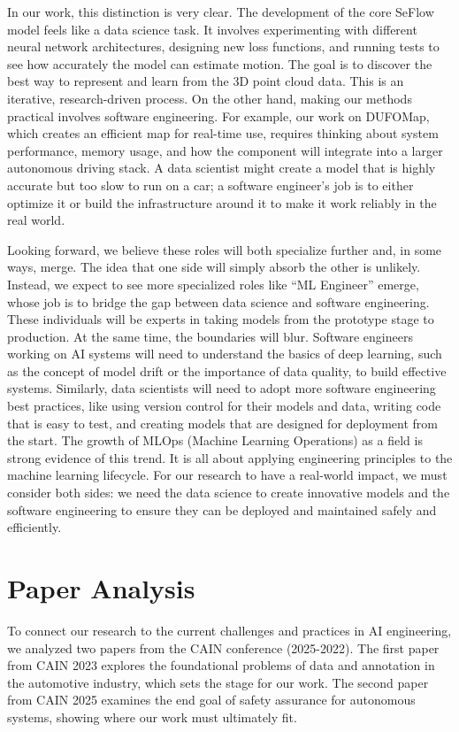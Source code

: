 \documentclass{article}
\begin{document}
In our work, this distinction is very clear. The development of the core SeFlow model feels like a data science task. It involves experimenting with different neural network architectures, designing new loss functions, and running tests to see how accurately the model can estimate motion. The goal is to discover the best way to represent and learn from the 3D point cloud data. This is an iterative, research-driven process. On the other hand, making our methods practical involves software engineering. For example, our work on DUFOMap, which creates an efficient map for real-time use, requires thinking about system performance, memory usage, and how the component will integrate into a larger autonomous driving stack. A data scientist might create a model that is highly accurate but too slow to run on a car; a software engineer's job is to either optimize it or build the infrastructure around it to make it work reliably in the real world.

Looking forward, we believe these roles will both specialize further and, in some ways, merge. The idea that one side will simply absorb the other is unlikely. Instead, we expect to see more specialized roles like ``ML Engineer'' emerge, whose job is to bridge the gap between data science and software engineering. 
These individuals will be experts in taking models from the prototype stage to production. 
At the same time, the boundaries will blur. Software engineers working on AI systems will need to understand the basics of deep learning, such as the concept of model drift or the importance of data quality, to build effective systems. 
Similarly, data scientists will need to adopt more software engineering best practices, like using version control for their models and data, writing code that is easy to test, and creating models that are designed for deployment from the start. 
The growth of MLOps (Machine Learning Operations) as a field is strong evidence of this trend. It is all about applying engineering principles to the machine learning lifecycle. 
For our research to have a real-world impact, we must consider both sides: we need the data science to create innovative models and the software engineering to ensure they can be deployed and maintained safely and efficiently.

\section{Paper Analysis}
To connect our research to the current challenges and practices in AI engineering, we analyzed two papers from the CAIN conference (2025-2022). The first paper from CAIN 2023 explores the foundational problems of data and annotation in the automotive industry, which sets the stage for our work. The second paper from CAIN 2025 examines the end goal of safety assurance for autonomous systems, showing where our work must ultimately fit.
\end{document}
